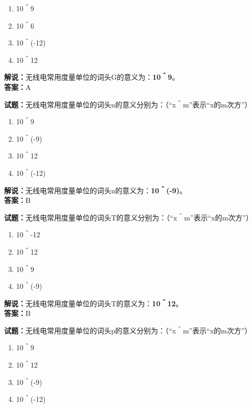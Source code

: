 \documentclass{ctexbook}
\begin{document}
\begin{enumerate}[leftmargin=3em]
	\item 10＾9
	\item 10＾6
	\item 10＾(-12)
	\item 10＾12
\end{enumerate}

\noindent\textbf{解说：}无线电常用度量单位的词头G的意义为：\textbf{10＾9}。\\\noindent\textbf{答案：}A


\bigskip


\noindent\textbf{试题：}无线电常用度量单位的词头n的意义分别为：（“x＾m”表示“x的m次方”）

\begin{enumerate}[leftmargin=3em]
	\item 10＾9
	\item 10＾(-9)
	\item 10＾12
	\item 10＾(-12)
\end{enumerate}

\noindent\textbf{解说：}无线电常用度量单位的词头n的意义为：\textbf{10＾(-9)}。\\\noindent\textbf{答案：}B


\bigskip


\noindent\textbf{试题：}无线电常用度量单位的词头T的意义分别为：（“x＾m”表示“x的m次方”）

\begin{enumerate}[leftmargin=3em]
	\item 10＾-12
	\item 10＾12
	\item 10＾9
	\item 10＾(-9)
\end{enumerate}

\noindent\textbf{解说：}无线电常用度量单位的词头T的意义为：\textbf{10＾12}。\\\noindent\textbf{答案：}B


\bigskip


\noindent\textbf{试题：}无线电常用度量单位的词头p的意义分别为：（“x＾m”表示“x的m次方”）

\begin{enumerate}[leftmargin=3em]
	\item 10＾9
	\item 10＾12
	\item 10＾(-9)
	\item 10＾(-12)
\end{enumerate}
\end{document}
